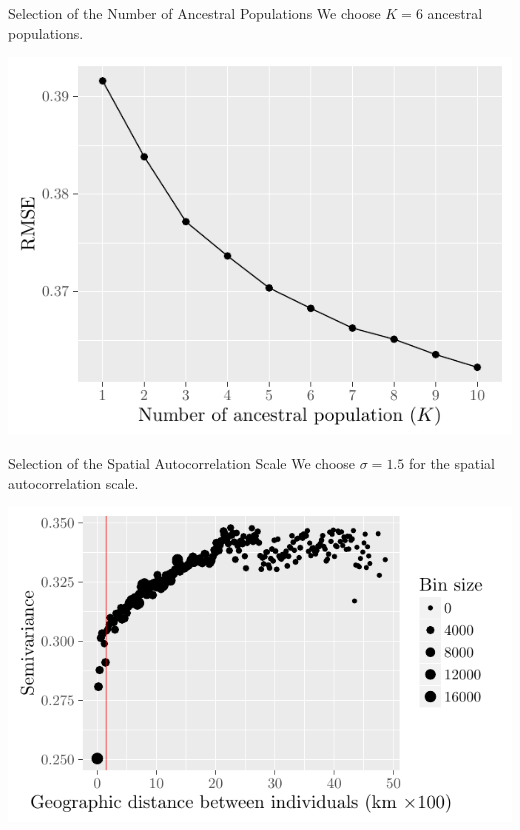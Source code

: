 \documentclass{beamer}\usepackage[]{graphicx}\usepackage[]{color}
\begin{document}

\begin{frame}{Selection of the Number of Ancestral Populations}
We choose \alert{$K = 6$} ancestral populations.

\begin{center}
\includegraphics{KSelection.pdf}
\end{center}

\end{frame}


\begin{frame}{Selection of the Spatial Autocorrelation Scale}
We choose \alert{$\sigma = 1.5$} for the spatial autocorrelation scale.
\begin{center}
\includegraphics{variogram.pdf}
\end{center}

\end{frame}
\end{document}
